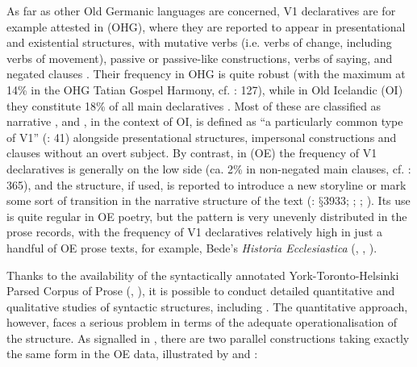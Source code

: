 \documentclass[output=paper,colorlinks,citecolor=brown]{langscibook}
\begin{document}
As far as other Old Germanic languages are concerned, V1 declaratives are for example attested in  (OHG), where they are reported to appear in presentational and existential structures, with mutative verbs (i.e. verbs of change, including verbs of movement), passive or passive-like constructions, verbs of saying, and negated clauses \citep{Axel2007}. Their frequency in OHG is quite robust (with the maximum at 14\% in the OHG Tatian Gospel Harmony, cf. \citealt{CichoszEtAl2016}: 127), while in Old Icelandic (OI) they constitute 18\% of all main declaratives \citep{booth2018}. Most of these are classified as narrative \citep[107]{booth2018}, and , in the context of OI, is defined as “a particularly common type of V1” (\citealt{booth-beck20200jhs}: 41) alongside presentational structures, impersonal constructions and clauses without an overt subject. By contrast, in  (OE) the frequency of V1 declaratives is generally on the low side (ca. 2\% in non-negated main clauses, cf. \citealt{Cichosz2020}: 365), and the structure, if used, is reported to introduce a new storyline or mark some sort of transition in the narrative structure of the text (\citealt{Mitchell1985}: $§$3933; \citealt{Los2000}; \citealt{Ohkado2004}; \citealt{Calle-MartínMiranda-García2010}). Its use is quite regular in OE poetry, but the pattern is very unevenly distributed in the prose records, with the frequency of V1 declaratives relatively high in just a handful of OE prose texts, for example, Bede's \textit{Historia Ecclesiastica} (\citealt{Ohkado2000}, \citealt{Calle-MartínMiranda-García2010}, \citealt{Cichosz2017}).

Thanks to the availability of the syntactically annotated York-Toronto-Helsinki Parsed Corpus of  Prose (, \citealt{TaylorTaylor2003}), it is possible to conduct detailed quantitative and qualitative studies of syntactic structures, including . The quantitative approach, however, faces a serious problem in terms of the adequate operationalisation of the structure. As signalled in \citet{Cichosz2022}, there are two parallel constructions taking exactly the same form in the OE data, illustrated by  and :
\end{document}
